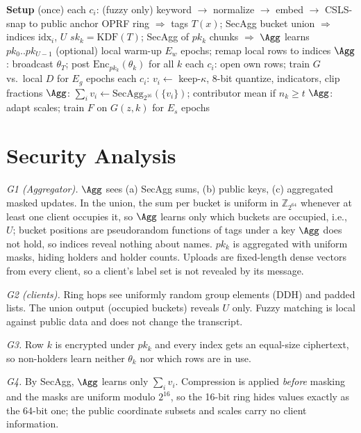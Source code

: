 \begin{algorithm}[t]
\caption{Label-private generative FL}
\label{alg:protocol}
\begin{algorithmic}[1]
\Statex \textbf{Setup} (once)
\State each $c_i$: (fuzzy only) keyword $\to$ normalize $\to$ embed $\to$ CSLS-snap to public anchor
\State OPRF ring $\Rightarrow$ tags $T(x)$; SecAgg bucket union $\Rightarrow$ indices $\mathrm{idx}_i$, $U$
\State $sk_k=\mathrm{KDF}(T)$; SecAgg of $pk_k$ chunks $\Rightarrow$ $\Agg$ learns $pk_0..pk_{U-1}$
\State (optional) local warm-up $E_w$ epochs; remap local rows to indices
  \State $\Agg$: broadcast $\theta_T$; post $\mathrm{Enc}_{pk_k}(\theta_k)$ for all $k$
  \State each $c_i$: open own rows; train $G$ vs.\ local $D$ for $E_g$ epochs
  \State each $c_i$: $v_i\gets$ keep-$\kappa$, 8-bit quantize, indicators, clip fractions
  \State $\Agg$: $\sum_i v_i\gets\mathrm{SecAgg}_{2^{16}}(\{v_i\})$; contributor mean if $n_k\ge t$
  \State $\Agg$: adapt scales; train $F$ on $G(z,k)$ for $E_s$ epochs
\EndFor
\end{algorithmic}
\end{algorithm}

\section{Security Analysis}
\label{sec:security}

\emph{G1 (Aggregator).} $\Agg$ sees (a) SecAgg sums, (b) public keys, (c) aggregated masked updates.
In the union, the sum per bucket is uniform in $\mathbb{Z}_{2^{64}}$ whenever at least one client
occupies it, so $\Agg$ learns only which buckets are occupied, i.e., $U$; bucket positions are
pseudorandom functions of tags under a key $\Agg$ does not hold, so indices reveal nothing about names.
$pk_k$ is aggregated with uniform masks, hiding holders and holder counts. Uploads are fixed-length
dense vectors from every client, so a client's label set is not revealed by its message.

\emph{G2 (clients).} Ring hops see uniformly random group elements (DDH) and padded lists. The union
output (occupied buckets) reveals $U$ only. Fuzzy matching is local against public data and does not
change the transcript.

\emph{G3.} Row $k$ is encrypted under $pk_k$ and every index gets an equal-size ciphertext, so
non-holders learn neither $\theta_k$ nor which rows are in use.

\emph{G4.} By SecAgg, $\Agg$ learns only $\sum_i v_i$. Compression is applied \emph{before} masking and
the masks are uniform modulo $2^{16}$, so the 16-bit ring hides values exactly as the 64-bit one; the
public coordinate subsets and scales carry no client information.

